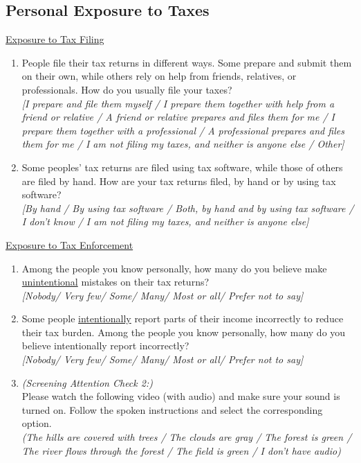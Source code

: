\documentclass[11pt]{article}
\begin{document}
\subsection*{Personal Exposure to Taxes}
\underline{Exposure to Tax Filing}
\begin{enumerate}[resume]
    \item People file their tax returns in different ways. Some prepare and submit them on their own, while others rely on help from friends, relatives, or professionals. How do you usually file your taxes? \\ 
    \textit{[I prepare and file them myself / I prepare them together with help from a friend or relative /  A friend or relative prepares and files them for me / I prepare them together with a professional / A professional prepares and files them for me / I am not filing my taxes, and neither is anyone else / Other]}
    \item Some peoples' tax returns are filed using tax software, while those of others are filed by hand. How are your tax returns filed, by hand or by using tax software?\\ 
    \textit{[By hand / By using tax software / Both, by hand and by using tax software / I don't know / I am not filing my taxes, and neither is anyone else]}
\end{enumerate}
\underline{Exposure to Tax Enforcement} 
\begin{enumerate}[resume]
    \item Among the people you know personally, how many do you believe make \uline{unintentional} mistakes on their tax returns?   \\ 
    \textit{[Nobody/ Very few/ Some/ Many/ Most or all/ Prefer not to say]}
    \item Some people \uline{intentionally} report parts of their income incorrectly to reduce their tax burden. Among the people you know personally, how many do you believe intentionally report incorrectly? \\ 
    \textit{[Nobody/ Very few/ Some/ Many/ Most or all/ Prefer not to say]}

    \item \textit{(Screening Attention Check 2:)} \\ Please watch the following video (with audio) and make sure your sound is turned on. Follow the spoken instructions and select the corresponding option. \\ \textit{(The hills are covered with trees / The clouds are gray / The forest is green / The river flows through the forest / The field is green / I don't have audio)}
\end{enumerate}
\end{document}
